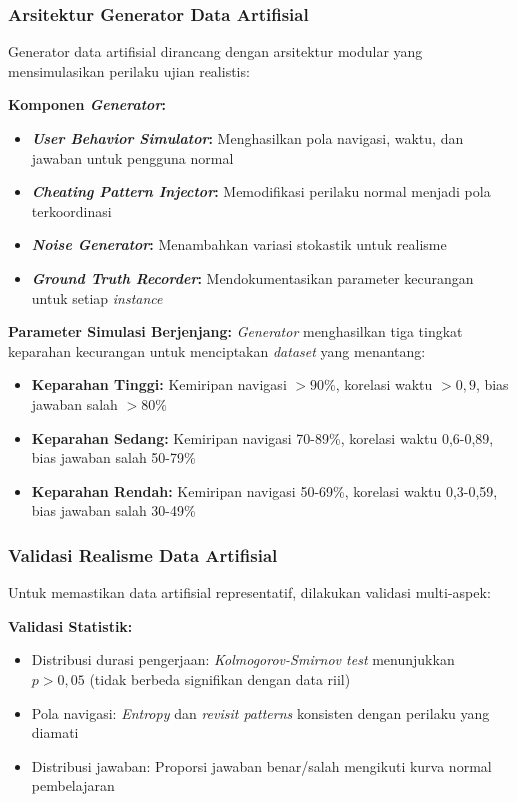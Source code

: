 \subsubsection{Arsitektur Generator Data Artifisial}
\label{sec:arsitekturGenerator}

Generator data artifisial dirancang dengan arsitektur modular yang mensimulasikan perilaku ujian realistis:

\textbf{Komponen \textit{Generator}:}
\begin{itemize}
    \item \textbf{\textit{User Behavior Simulator}:} Menghasilkan pola navigasi, waktu, dan jawaban untuk pengguna normal
    \item \textbf{\textit{Cheating Pattern Injector}:} Memodifikasi perilaku normal menjadi pola terkoordinasi
    \item \textbf{\textit{Noise Generator}:} Menambahkan variasi stokastik untuk realisme
    \item \textbf{\textit{Ground Truth Recorder}:} Mendokumentasikan parameter kecurangan untuk setiap \textit{instance}
\end{itemize}

\textbf{Parameter Simulasi Berjenjang:}
\textit{Generator} menghasilkan tiga tingkat keparahan kecurangan untuk menciptakan \textit{dataset} yang menantang:
\begin{itemize}
    \item \textbf{Keparahan Tinggi:} Kemiripan navigasi $>90\%$, korelasi waktu $>0,9$, bias jawaban salah $>80\%$
    \item \textbf{Keparahan Sedang:} Kemiripan navigasi 70-89\%, korelasi waktu 0,6-0,89, bias jawaban salah 50-79\%
    \item \textbf{Keparahan Rendah:} Kemiripan navigasi 50-69\%, korelasi waktu 0,3-0,59, bias jawaban salah 30-49\%
\end{itemize}

\subsubsection{Validasi Realisme Data Artifisial}
\label{sec:validasiRealismeArtifisial}

Untuk memastikan data artifisial representatif, dilakukan validasi multi-aspek:

\textbf{Validasi Statistik:}
\begin{itemize}
    \item Distribusi durasi pengerjaan: \textit{Kolmogorov-Smirnov test} menunjukkan $p>0,05$ (tidak berbeda signifikan dengan data riil)
    \item Pola navigasi: \textit{Entropy} dan \textit{revisit patterns} konsisten dengan perilaku yang diamati
    \item Distribusi jawaban: Proporsi jawaban benar/salah mengikuti kurva normal pembelajaran
\end{itemize}

